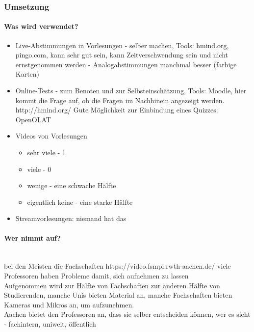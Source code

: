 \begin{itemize}
	\subsubsection*{Umsetzung}
		\paragraph{Was wird verwendet?}
			\begin{itemize}
				\item Live-Abstimmungen in Vorlesungen - selber machen, Tools: hmind.org, pingo.com,
				kann sehr gut sein,
				kann Zeitverschwendung sein und nicht ernstgenommen werden - Analogabstimmungen manchmal besser (farbige Karten)

				\item Online-Tests - zum Benoten und zur Selbsteinschätzung, Tools: Moodle,
				hier kommt die Frage auf, ob die Fragen im Nachhinein angezeigt werden.
				http://hmind.org/
				Gute Möglichkeit zur Einbindung eines Quizzes: OpenOLAT

				\item Videos von Vorlesungen
					\begin{itemize}
						\item sehr viele - 1
						\item viele - 0
						\item wenige - eine schwache Hälfte
						\item eigentlich keine - eine starke Hälfte
					\end{itemize}

				\item Streamvorlesungen:
				niemand hat das
			\end{itemize}

	\paragraph{Wer nimmt auf?} \\
		bei den Meisten die Fachschaften
		https://video.fsmpi.rwth-aachen.de/
		viele Professoren haben Probleme damit, sich aufnehmen zu lassen \\

		Aufgenommen wird zur Hälfte von Fachschaften zur anderen Hälfte von Studierenden,
		manche Unis bieten Material an,
		manche Fachschaften bieten Kameras und Mikros an, um aufzunehmen. \\

		Aachen bietet den Professoren an, dass sie selber entscheiden können, wer es sieht - fachintern, uniweit, öffentlich\\


\end{itemize}
